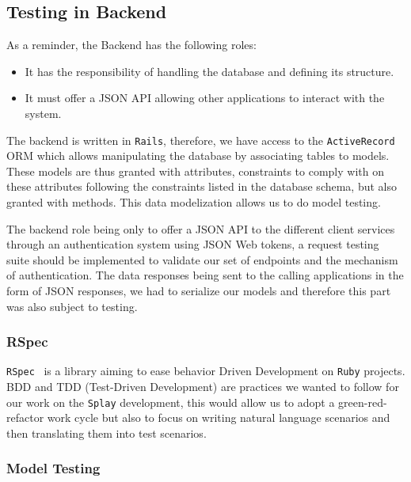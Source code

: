 \documentclass{eplmastersthesis}
\begin{document}
      \subsection{Testing in Backend}

        As a reminder, the Backend has the following
        roles:

        \begin{itemize}
          \item It has the responsibility of handling the database and
          defining its structure.
          \item It must offer a JSON API allowing other applications to interact
          with the system.
        \end{itemize}

        The backend is written in \texttt{Rails}, therefore, we have access to the
        \texttt{ActiveRecord} ORM which allows manipulating the database by associating
        tables to models. These models are thus granted with attributes,
        constraints to comply with on these attributes following the constraints
        listed in the database schema, but also granted with methods. This data
        modelization allows us to do model testing.

        The backend role being only to offer a JSON API to the different client
        services through an authentication system using JSON Web tokens, a
        request testing suite should be implemented to validate our set of
        endpoints and the mechanism of authentication.
        The data responses being sent to the calling applications in the form
        of JSON responses, we had to serialize our models and therefore this
        part was also subject to testing.

        \subsubsection{RSpec}

          \texttt{RSpec}~\cite{rspec} is a library aiming to ease behavior Driven
          Development on \texttt{Ruby} projects. BDD and TDD (Test-Driven Development) are
          practices we wanted to follow for our work on the \texttt{Splay} development,
          this would allow us to adopt a green-red-refactor work cycle but also
          to focus on writing natural language scenarios and then translating
          them into test scenarios.

        \subsubsection{Model Testing}
\end{document}
